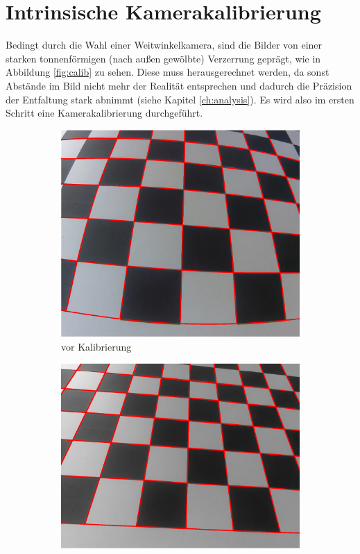 \section{Intrinsische Kamerakalibrierung}
\label{s:intrinsic}
Bedingt durch die Wahl einer Weitwinkelkamera, sind die Bilder von einer starken tonnenförmigen (nach außen gewölbte) Verzerrung geprägt, wie in Abbildung \ref{fig:calib} zu sehen. Diese muss herausgerechnet werden, da sonst Abstände im Bild nicht mehr der Realität entsprechen und dadurch die Präzision der Entfaltung stark abnimmt (siehe Kapitel \ref{ch:analysis}). Es wird also im ersten Schritt eine Kamerakalibrierung durchgeführt.


\begin{figure}[!htb]
	\centering
\begin{subfigure}{.5\textwidth}
	\centering
	\includegraphics[scale=.35]{images/calibrationRaspi.eps}
	\caption{vor Kalibrierung}
	\label{fig:calibDist}
\end{subfigure}%
\begin{subfigure}{.5\textwidth}
	\centering
	\includegraphics[scale=.4]{images/calibrationRaspi2.eps}

\end{subfigure}
\end{figure}
